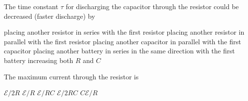 \documentclass{../../oss-apphys-exam}
\begin{document}
\begin{multicols*}{2}
  \question The time constant $\tau$ for discharging the capacitor through the
  resistor could be decreased (faster discharge) by
  \label{switch1}
  \begin{choices}
    \choice placing another resistor in series with the first resistor
    \choice placing another resistor in parallel with the first resistor
    \choice placing another capacitor in parallel with the first capacitor
    \choice placing another battery in series in the same direction with the
    first battery
    \choice increasing both $R$ and $C$
  \end{choices}
  
  \question The maximum current through the resistor is
  \label{switch2}
  \begin{choices}
    \choice $\mathcal E/2R$
    \choice $\mathcal E/R$
    \choice $\mathcal E/RC$
    \choice $\mathcal E/2RC$
    \choice $C\mathcal E/R$
  \end{choices}
  

\end{multicols*}
\end{document}
